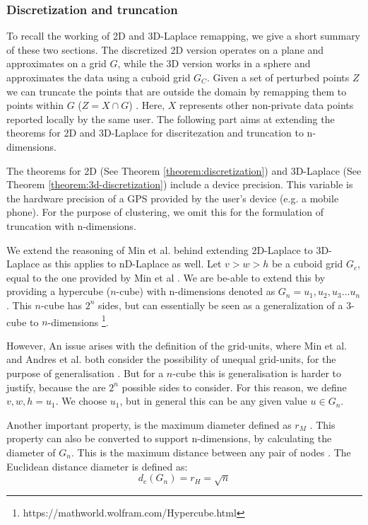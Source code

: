 \subsubsection{Discretization and truncation} \label{theory:nd-laplace-truncation}
To recall the working of 2D and 3D-Laplace remapping, we give a short summary of these two sections. The discretized 2D version operates on a plane and approximates on a grid $G$, while the 3D version works in a sphere and approximates the data using a cuboid grid  $G_C$.
Given a set of perturbed points $Z$ we can truncate the points that are outside the domain by remapping them to points within $G$ ($Z = X \cap G$) \citep{DBLP:journals/corr/abs-1212-1984}.
Here, $X$ represents other non-private data points reported locally by the same user.
The following part aims at extending the theorems for 2D and 3D-Laplace for discritezation and truncation to n-dimensions. \newline

The theorems for 2D (See Theorem \ref{theorem:discretization}) and 3D-Laplace (See Theorem \ref{theorem:3d-discretization}) include a device precision. 
This variable is the hardware precision of a GPS provided by the user's device (e.g. a mobile phone). 
For the purpose of clustering, we omit this for the formulation of truncation with n-dimensions.

We extend the reasoning of Min et al. behind extending 2D-Laplace to 3D-Laplace as this applies to nD-Laplace as well.
Let $v > w > h$ be a cuboid grid $G_c$, equal to the one provided by Min et al \citep{9646489}.
We are be-able to extend this by providing a hypercube ($n$-cube) with n-dimensions denoted as $G_n = u_1, u_2, u_3 ... u_n$. This $n$-cube has $2^n$ sides, but can essentially be seen as a generalization of a 3-cube to $n$-dimensions \footnote{https://mathworld.wolfram.com/Hypercube.html}.

However, An issue arises with the definition of the grid-units, where Min et al. and Andres et al. both consider the possibility of unequal grid-units, for the purpose of generalisation \citep{9646489, DBLP:journals/corr/abs-1212-1984}. 
But for a $n$-cube this is generalisation is harder to justify, because the are $2^n$ possible sides to consider.
For this reason, we define $v, w, h = u_1$. We choose $u_1$, but in general this can be any given value $u \in G_n$.

Another important property, is the maximum diameter defined as $r_M$ \citep{9646489}.
This property can also be converted to support n-dimensions, by calculating the diameter of $G_n$.
This is the maximum distance between any pair of nodes \citep{HARARY1988277}. \newline
The Euclidean distance diameter is defined as:
\begin{equation}
  d_e(G_n) = r_H = \sqrt{n}
\end{equation}

